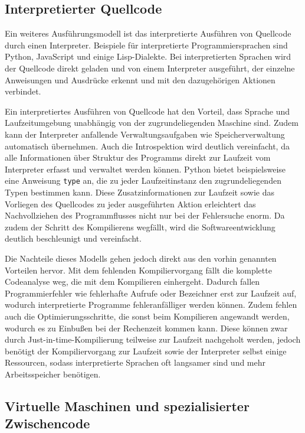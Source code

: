 \documentclass[11pt, parskip=half]{scrartcl}       %
\begin{document}
\subsection{Interpretierter Quellcode}

Ein weiteres Ausführungsmodell ist das interpretierte Ausführen von Quellcode durch einen Interpreter.
Beispiele für interpretierte Programmiersprachen sind Python, JavaScript und einige Lisp-Dialekte.
Bei interpretierten Sprachen wird der Quellcode direkt geladen und von einem Interpreter ausgeführt, der einzelne Anweisungen und Ausdrücke erkennt und mit den dazugehörigen Aktionen verbindet.

Ein interpretiertes Ausführen von Quellcode hat den Vorteil, dass Sprache und Laufzeitumgebung unabhängig von der zugrundeliegenden Maschine sind.
Zudem kann der Interpreter anfallende Verwaltungsaufgaben wie Speicherverwaltung automatisch übernehmen.
Auch die Introspektion wird deutlich vereinfacht, da alle Informationen über Struktur des Programms direkt zur Laufzeit vom Interpreter erfasst und verwaltet werden können.
Python bietet beispielsweise eine Anweisung \texttt{type} an, die zu jeder Laufzeitinstanz den zugrundeliegenden Typen bestimmen kann.
Diese Zusatzinformationen zur Laufzeit sowie das Vorliegen des Quellcodes zu jeder ausgeführten Aktion erleichtert das Nachvollziehen des Programmflusses nicht nur bei der Fehlersuche enorm.
Da zudem der Schritt des Kompilierens wegfällt, wird die Softwareentwicklung deutlich beschleunigt und vereinfacht.

Die Nachteile dieses Modells gehen jedoch direkt aus den vorhin genannten Vorteilen hervor.
Mit dem fehlenden Kompiliervorgang fällt die komplette Codeanalyse weg, die mit dem Kompilieren einhergeht.
Dadurch fallen Programmierfehler wie fehlerhafte Aufrufe oder Bezeichner erst zur Laufzeit auf, wodurch interpretierte Programme fehleranfälliger werden können.
Zudem fehlen auch die Optimierungsschritte, die sonst beim Kompilieren angewandt werden, wodurch es zu Einbußen bei der Rechenzeit kommen kann.
Diese können zwar durch Just-in-time-Kompilierung teilweise zur Laufzeit nachgeholt werden, jedoch benötigt der Kompiliervorgang zur Laufzeit sowie der Interpreter selbst einige Ressourcen, sodass interpretierte Sprachen oft langsamer sind und mehr Arbeitsspeicher benötigen.\cite{stackoverflow_pros_and_cons_interpreted_languages}

\subsection{Virtuelle Maschinen und spezialisierter Zwischencode}
\end{document}
